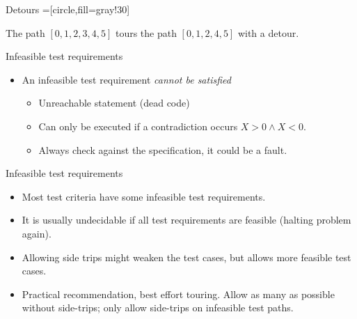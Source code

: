 \documentclass[handout]{beamer}
\begin{document}
\begin{frame}{Detours}
 =[circle,fill=gray!30]
  
The path $[0,1,2,3,4,5]$ tours the path $[0,1,2,4,5]$ with a detour.
\end{frame}
\begin{frame}{Infeasible  test requirements}
  \begin{itemize}
  \item An infeasible test requirement {\em cannot be satisfied}
    \begin{itemize}
    \item Unreachable statement (dead code)
    \item Can only be executed if a contradiction occurs $X>0 \land
      X<0$.
    \item Always check against the specification, it could be a fault. 
    \end{itemize}
  \end{itemize}
  
\end{frame}
\begin{frame}{Infeasible  test requirements}
  \begin{itemize}
  \item   Most test criteria have some infeasible test requirements. 
  \item It is usually undecidable if all test requirements
    are feasible (halting problem again).
  \item Allowing side trips might weaken the test cases, but allows
    more feasible test cases.
  \item Practical recommendation, best effort touring. Allow as many
    as possible without side-trips; only allow side-trips on
    infeasible test paths.
  \end{itemize}

  
\end{frame}
\end{document}
